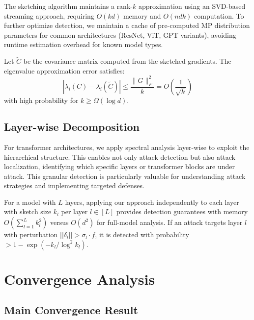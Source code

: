 \documentclass[runningheads]{llncs}
\begin{document}
The sketching algorithm maintains a rank-$k$ approximation using an SVD-based streaming approach, requiring $O(kd)$ memory and $O(ndk)$ computation. To further optimize detection, we maintain a cache of pre-computed MP distribution parameters for common architectures (ResNet, ViT, GPT variants), avoiding runtime estimation overhead for known model types.

\begin{theorem}
Let $\tilde{C}$ be the covariance matrix computed from the sketched gradients. The eigenvalue approximation error satisfies:
\begin{equation}
|\lambda_i(C) - \lambda_i(\tilde{C})| \leq \frac{\|G\|_F^2}{k} = O\left(\frac{1}{\sqrt{k}}\right)
\end{equation}
with high probability for $k \geq \Omega(\log d)$.
\end{theorem}

\subsection{Layer-wise Decomposition}

For transformer architectures, we apply spectral analysis layer-wise to exploit the hierarchical structure. This enables not only attack detection but also attack localization, identifying which specific layers or transformer blocks are under attack. This granular detection is particularly valuable for understanding attack strategies and implementing targeted defenses.

\begin{theorem}
For a model with $L$ layers, applying our approach independently to each layer with sketch size $k_l$ per layer $l \in [L]$ provides detection guarantees with memory $O(\sum_{l=1}^L k_l^2)$ versus $O(d^2)$ for full-model analysis. If an attack targets layer $l$ with perturbation $||\delta_l|| > \sigma_l \cdot f$, it is detected with probability $> 1 - \exp(-k_l/\log^2 k_l)$.
\end{theorem}

\section{Convergence Analysis}

\subsection{Main Convergence Result}
\end{document}
